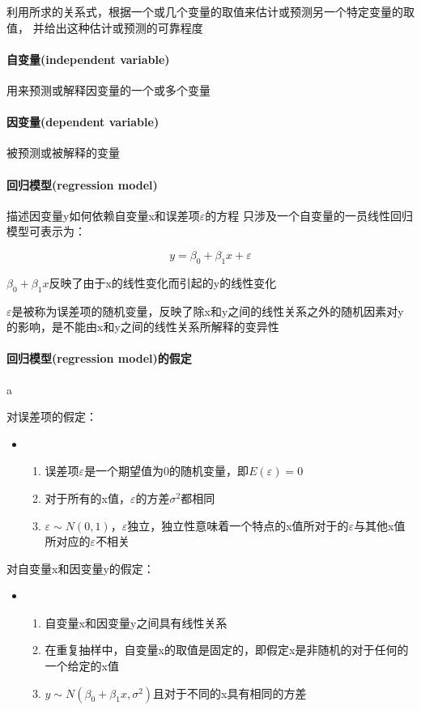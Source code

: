 \documentclass[UTF8,10pt]{book}
\begin{document}
利用所求的关系式，根据一个或几个变量的取值来估计或预测另一个特定变量的取值，
并给出这种估计或预测的可靠程度

\paragraph{自变量(independent variable)	}用来预测或解释因变量的一个或多个变量
\paragraph{因变量(dependent variable)	}被预测或被解释的变量
\paragraph{回归模型(regression model)	}描述因变量y如何依赖自变量x和误差项$\varepsilon$的方程 只涉及一个自变量的一员线性回归模型可表示为： 

$$y = \beta_0 + \beta_1 x+ \varepsilon$$ 

$\beta_0 + \beta_1 x$反映了由于x的线性变化而引起的y的线性变化 

$\varepsilon$是被称为误差项的随机变量，反映了除x和y之间的线性关系之外的随机因素对y的影响，是不能由x和y之间的线性关系所解释的变异性

\paragraph{回归模型(regression model)的假定	}a

对误差项的假定：


\begin{itemize}
	\item [] {
		\begin{enumerate}
			\item 误差项$\varepsilon$是一个期望值为0的随机变量，即$E(\varepsilon)=0$
			\item 对于所有的x值，$\varepsilon$的方差$\sigma^2$都相同
			\item $\varepsilon \sim N(0,1) $，$\varepsilon$独立，独立性意味着一个特点的x值所对于的$\varepsilon$与其他x值所对应的$\varepsilon$不相关 
			
		\end{enumerate}
	}
\end{itemize}

对自变量x和因变量y的假定：





\begin{itemize}
	\item [] {
		\begin{enumerate}
			\item 自变量x和因变量y之间具有线性关系
			\item 在重复抽样中，自变量x的取值是固定的，即假定x是非随机的对于任何的一个给定的x值			
			\item $y \sim N(\beta_0 + \beta_1 x ,\sigma^2) $且对于不同的x具有相同的方差
			
		\end{enumerate}
	}
\end{itemize}
\end{document}
